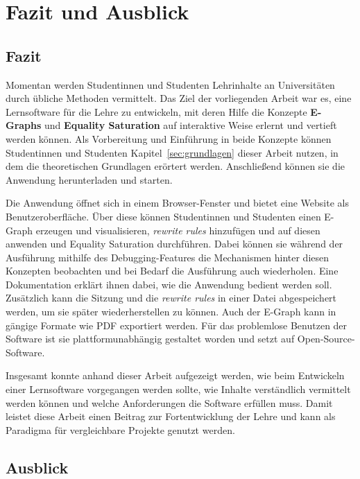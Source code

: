 \section{Fazit und Ausblick}\label{sec:fazit}

\subsection{Fazit}

Momentan werden Studentinnen und Studenten Lehrinhalte an Universitäten durch übliche Methoden vermittelt. Das Ziel der vorliegenden Arbeit war es, eine Lernsoftware für die Lehre
zu entwickeln, mit deren Hilfe die Konzepte \textbf{E-Graphs} und \textbf{Equality Saturation} auf interaktive Weise erlernt und vertieft werden können.
Als Vorbereitung und Einführung in beide Konzepte können Studentinnen und Studenten Kapitel~\ref{sec:grundlagen} dieser Arbeit nutzen, in dem die theoretischen Grundlagen erörtert werden.
Anschließend können sie die Anwendung herunterladen und starten. 

Die Anwendung öffnet sich in einem Browser-Fenster und bietet eine Website als Benutzeroberfläche. Über diese können Studentinnen und Studenten einen E-Graph erzeugen und visualisieren, 
\textit{rewrite rules} hinzufügen und auf diesen anwenden und Equality Saturation durchführen. 
Dabei können sie während der Ausführung mithilfe des Debugging-Features die Mechanismen hinter diesen Konzepten beobachten und bei Bedarf die Ausführung auch wiederholen.
Eine Dokumentation erklärt ihnen dabei, wie die Anwendung bedient werden soll. Zusätzlich kann die Sitzung und die \textit{rewrite rules} in einer Datei abgespeichert werden, um
sie später wiederherstellen zu können. Auch der E-Graph kann in gängige Formate wie PDF exportiert werden.
Für das problemlose Benutzen der Software ist sie plattformunabhängig gestaltet worden und setzt auf Open-Source-Software.





Insgesamt konnte anhand dieser Arbeit aufgezeigt werden, wie beim Entwickeln einer Lernsoftware vorgegangen werden sollte, wie Inhalte verständlich vermittelt werden können und welche
Anforderungen die Software erfüllen muss.
Damit leistet diese Arbeit einen Beitrag zur Fortentwicklung der Lehre und kann als Paradigma für vergleichbare Projekte genutzt werden.

\subsection{Ausblick}

